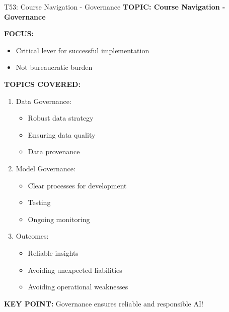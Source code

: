 \documentclass[8pt]{beamer}
\begin{document}
	\begin{frame}{T53: Course Navigation - Governance}
		\fontsize{6.5}{7.5}\selectfont
		\textbf{TOPIC: Course Navigation - Governance}
		
		\vspace{0.1cm}
		\textbf{FOCUS:}
		\begin{itemize}
			\item Critical lever for successful implementation
			\item Not bureaucratic burden
		\end{itemize}
		
		\vspace{0.1cm}
		\textbf{TOPICS COVERED:}
		\begin{enumerate}
			\item \textcolor{myblue}{Data Governance:}
			\begin{itemize}
				\item Robust data strategy
				\item Ensuring data quality
				\item Data provenance
			\end{itemize}
			\item \textcolor{myblue}{Model Governance:}
			\begin{itemize}
				\item Clear processes for development
				\item Testing
				\item Ongoing monitoring
			\end{itemize}
			\item \textcolor{myblue}{Outcomes:}
			\begin{itemize}
				\item Reliable insights
				\item Avoiding unexpected liabilities
				\item Avoiding operational weaknesses
			\end{itemize}
		\end{enumerate}
		
		\textcolor{myred}{\textbf{KEY POINT:}} Governance ensures \textcolor{myblue}{reliable and responsible AI}!
	\end{frame}
	
\end{document}
